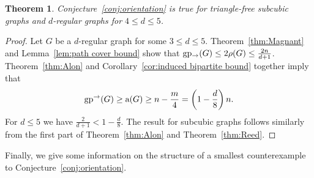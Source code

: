 \documentclass[a4paper,12pt]{article}
\newtheorem{theorem}{Theorem}[section]
\theoremstyle{definition}
\newcommand{\ac}{{\rm a}}
\newcommand{\ugp}{{\rm gp^{\rightarrow }}}
\newcommand{\lgp}{{\rm gp_{\rightarrow }}}
\begin{document}
	
	\begin{theorem}\label{thm:max degree 5}
		Conjecture~\ref{conj:orientation} is true for triangle-free subcubic graphs and $d$-regular graphs for $4 \leq d \leq 5$.
	\end{theorem}
	\begin{proof}
		Let $G$ be a $d$-regular graph for some $3 \leq d \leq 5$. Theorem~\ref{thm:Magnant} and Lemma~\ref{lem:path cover bound} show that $\lgp (G) \leq 2\rho (G) \leq \frac{2n}{d+1}$. Theorem~\ref{thm:Alon} and Corollary~\ref{cor:induced bipartite bound} together imply that \[ \ugp (G) \geq \ac (G) \geq n-\frac{m}{4} = \left ( 1-\frac{d}{8}\right ) n. \] For $d \leq 5$ we have $\frac{2}{d+1} < 1-\frac{d}{8}$. The result for subcubic graphs follows similarly from the first part of Theorem~\ref{thm:Alon} and Theorem~\ref{thm:Reed}.
	\end{proof}
	
	Finally, we give some information on the structure of a smallest counterexample to Conjecture~\ref{conj:orientation}.
	
\end{document}
